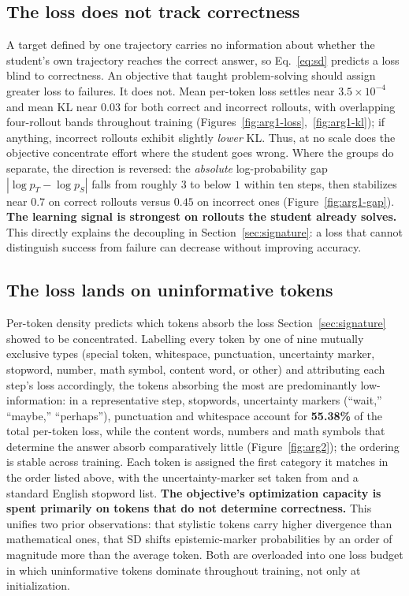\documentclass{article}
\begin{document}
\subsection{The loss does not track correctness}
\label{sec:arg1}
A target defined by one trajectory carries no information about whether the student's own trajectory reaches the correct answer, so Eq.~\ref{eq:sd} predicts a loss blind to correctness. An objective that taught problem-solving should assign greater loss to failures. It does not. Mean per-token loss settles near $3.5\times10^{-4}$ and mean KL near $0.03$ for both correct and incorrect rollouts, with overlapping four-rollout bands throughout training (Figures~\ref{fig:arg1-loss},~\ref{fig:arg1-kl}); if anything, incorrect rollouts exhibit slightly \emph{lower} KL. Thus, at no scale does the objective concentrate effort where the student goes wrong. Where the groups do separate, the direction is reversed: the \emph{absolute} log-probability gap $|\log p_T-\log p_S|$ falls from roughly $3$ to below $1$ within ten steps, then stabilizes near $0.7$ on correct rollouts versus $0.45$ on incorrect ones (Figure~\ref{fig:arg1-gap}). \textbf{The learning signal is strongest on rollouts the student already solves.} This directly explains the decoupling in Section~\ref{sec:signature}: a loss that cannot distinguish success from failure can decrease without improving accuracy.



\subsection{The loss lands on uninformative tokens}
\label{sec:arg2}
Per-token density predicts which tokens absorb the loss Section~\ref{sec:signature} showed to be concentrated. Labelling every token by one of nine mutually exclusive types (special token, whitespace, punctuation, uncertainty marker, stopword, number, math symbol, content word, or other) and attributing each step's loss accordingly, the tokens absorbing the most are predominantly low-information: in a representative step, stopwords, uncertainty markers (``wait,'' ``maybe,'' ``perhaps''), punctuation and whitespace account for \textbf{55.38\%} of the total per-token loss, while the content words, numbers and math symbols that determine the answer absorb comparatively little (Figure~\ref{fig:arg2}); the ordering is stable across training. Each token is assigned the first category it matches in the order listed above, with the uncertainty-marker set taken from \citet{opsd2025} and a standard English stopword list. \textbf{The objective's optimization capacity is spent primarily on tokens that do not determine correctness.} This unifies two prior observations: \citet{opsd2025} that stylistic tokens carry higher divergence than mathematical ones, \citet{reasoning_degrades2025} that SD shifts epistemic-marker probabilities by an order of magnitude more than the average token. Both are overloaded into one loss budget in which uninformative tokens dominate throughout training, not only at initialization.
\end{document}
